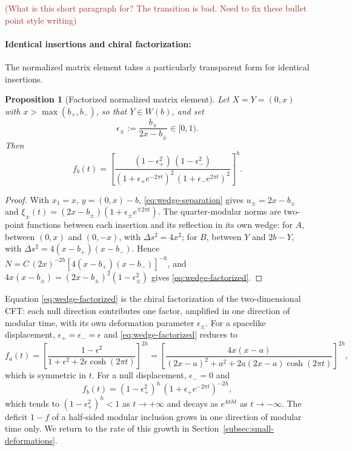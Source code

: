 \documentclass[a4paper,11pt]{article}
\newtheorem{proposition}[theorem]{Proposition}
\theoremstyle{definition}
\newcommand{\KL}[1]{\textcolor{brown}{#1}}
\begin{document}
\KL{(What is this short paragraph for? The transition is bad. Need to fix these bullet point style writing)}
\paragraph{Identical insertions and chiral factorization:}
The normalized matrix element takes a particularly transparent form for identical insertions.

\begin{proposition}[Factorized normalized matrix element]\label{prop:wedge-factorized}
Let $X=Y=(0,x)$ with $x>\max(b_+,b_-)$, so that $Y\in W(b)$, and set
\begin{equation}
 \epsilon_\pm:=\frac{b_\pm}{2x-b_\pm}\in[0,1).
\end{equation}
Then
\begin{equation}
 f_b(t)=\left[\frac{(1-\epsilon_+^2)\,(1-\epsilon_-^2)}{(1+\epsilon_+e^{-2\pi t})^2\,(1+\epsilon_-e^{2\pi t})^2}\right]^{h}.
 \label{eq:wedge-factorized}
\end{equation}
\end{proposition}
\begin{proof}
With $x_1=x$, $y=(0,x)-b$, \eqref{eq:wedge-separation} gives $u_\pm=2x-b_\pm$ and $\xi_\pm(t)=(2x-b_\pm)(1+\epsilon_\pm e^{\mp2\pi t})$. The quarter-modular norms are two-point functions between each insertion and its reflection in its own wedge: for $A$, between $(0,x)$ and $(0,-x)$, with $\Delta s^2=4x^2$; for $B$, between $Y$ and $2b-Y$, with $\Delta s^2=4(x-b_+)(x-b_-)$. Hence $N=C\,(2x)^{-2h}[4(x-b_+)(x-b_-)]^{-h}$, and $4x(x-b_\pm)=(2x-b_\pm)^2(1-\epsilon_\pm^2)$ gives \eqref{eq:wedge-factorized}.
\end{proof}

Equation \eqref{eq:wedge-factorized} is the chiral factorization of the two-dimensional CFT: each null direction contributes one factor, amplified in one direction of modular time, with its own deformation parameter $\epsilon_\pm$. For a spacelike displacement, $\epsilon_+=\epsilon_-=\epsilon$ and \eqref{eq:wedge-factorized} reduces to
\begin{equation}
 f_a(t)=\left[\frac{1-\epsilon^2}{1+\epsilon^2+2\epsilon\cosh(2\pi t)}\right]^{2h}
 =\left[\frac{4x(x-a)}{(2x-a)^2+a^2+2a(2x-a)\cosh(2\pi t)}\right]^{2h},
 \label{eq:normalized-small-wedge}
\end{equation}
which is symmetric in $t$. For a null displacement, $\epsilon_-=0$ and
\begin{equation}
 f_b(t)=(1-\epsilon_+^2)^h\,(1+\epsilon_+e^{-2\pi t})^{-2h},
 \label{eq:normalized-hsmi}
\end{equation}
which tends to $(1-\epsilon_+^2)^h<1$ as $t\to+\infty$ and decays as $e^{4\pi ht}$ as $t\to-\infty$. The deficit $1-f$ of a half-sided modular inclusion grows in one direction of modular time only. We return to the rate of this growth in Section~\ref{subsec:small-deformations}.
\end{document}
